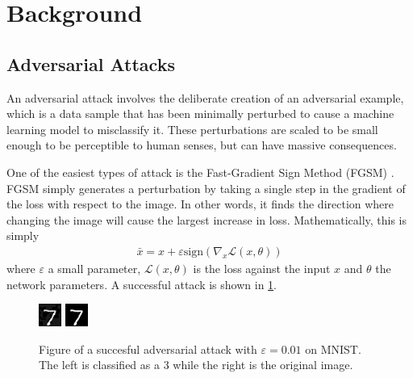 \documentclass{article}
\begin{document}
    \section{Background}

    \subsection{Adversarial Attacks}
    An adversarial attack involves the deliberate creation of an adversarial example, which is a data sample that has been minimally perturbed to cause a machine learning model to misclassify it.
    These perturbations are scaled to be small enough to be perceptible to human senses, but can have massive consequences.

    One of the easiest types of attack is the Fast-Gradient Sign Method (FGSM) \citep{goodfellow2015explainingharnessingadversarialexamples}.
    FGSM simply generates a perturbation by taking a single step in the gradient of the loss with respect to the image.
    In other words, it finds the direction where changing the image will cause the largest increase in loss.
    Mathematically, this is simply
    \begin{align}
        \label{eqn:fgsm}
        \bar x = x + \varepsilon \text{sign}(\nabla_x \mathcal L(x, \theta))
    \end{align}
    where $\varepsilon$ a small parameter, $\mathcal L(x, \theta)$ is the loss against the input $x$ and $\theta$ the network parameters.
    A successful attack is shown in \cref{fig:attack}.

    \begin{figure}
        \centering
        \includegraphics{../src/multirun/2025-08-30/22-19-32/0/fgsm_examples/adversarial_200_0_label_3.png}
        \includegraphics{../src/multirun/2025-08-30/22-19-32/0/fgsm_examples/original_200_0_label_7.png}
        \caption{Figure of a succesful adversarial attack with $\varepsilon=0.01$ on MNIST.
        The left is classified as a 3 while the right is the original image.}
        \label{fig:attack}
    \end{figure}
\end{document}
